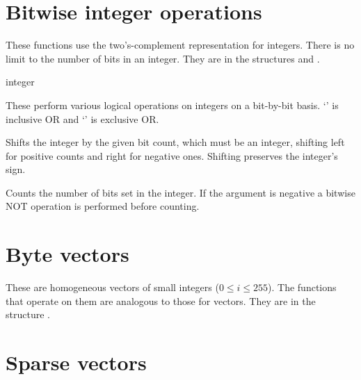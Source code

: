 \section{Bitwise integer operations}

These functions use the two's-complement representation for integers.
There is no limit to the number of bits in an integer.
They are in the structures  and .

\begin{protos}
 {integer}
\end{protos}
\noindent
These perform various logical operations on integers on a bit-by-bit
basis. `' is inclusive OR and `' is exclusive OR.

\begin{protos}
\end{protos}
\noindent Shifts the integer by the given bit count, which must be an integer,
 shifting left for positive counts and right for negative ones.
Shifting preserves the integer's sign.

\begin{protos}
\end{protos}
\noindent Counts the number of bits set in the integer.
If the argument is negative a bitwise NOT operation is performed
 before counting.

\section{Byte vectors}

These are homogeneous vectors of small integers ($0 \le i \le 255$).
The functions that operate on them are analogous to those for vectors.
They are in the structure .

\begin{protos}
\end{protos}

\section{Sparse vectors}

